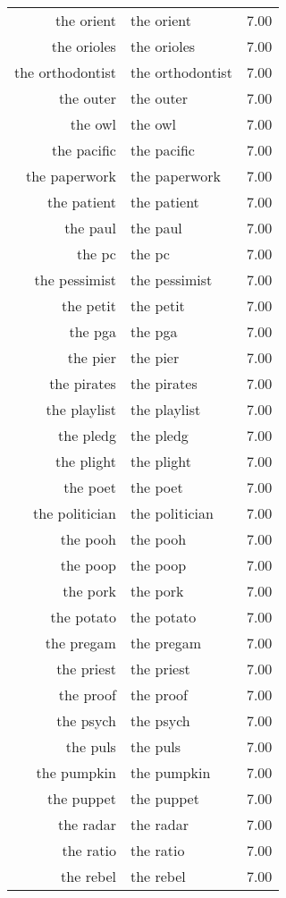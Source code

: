 \begin{table}[ht]
\begin{tabular}{rlr}
  the orient & the orient & 7.00 \\ 
  the orioles & the orioles & 7.00 \\ 
  the orthodontist & the orthodontist & 7.00 \\ 
  the outer & the outer & 7.00 \\ 
  the owl & the owl & 7.00 \\ 
  the pacific & the pacific & 7.00 \\ 
  the paperwork & the paperwork & 7.00 \\ 
  the patient & the patient & 7.00 \\ 
  the paul & the paul & 7.00 \\ 
  the pc & the pc & 7.00 \\ 
  the pessimist & the pessimist & 7.00 \\ 
  the petit & the petit & 7.00 \\ 
  the pga & the pga & 7.00 \\ 
  the pier & the pier & 7.00 \\ 
  the pirates & the pirates & 7.00 \\ 
  the playlist & the playlist & 7.00 \\ 
  the pledg & the pledg & 7.00 \\ 
  the plight & the plight & 7.00 \\ 
  the poet & the poet & 7.00 \\ 
  the politician & the politician & 7.00 \\ 
  the pooh & the pooh & 7.00 \\ 
  the poop & the poop & 7.00 \\ 
  the pork & the pork & 7.00 \\ 
  the potato & the potato & 7.00 \\ 
  the pregam & the pregam & 7.00 \\ 
  the priest & the priest & 7.00 \\ 
  the proof & the proof & 7.00 \\ 
  the psych & the psych & 7.00 \\ 
  the puls & the puls & 7.00 \\ 
  the pumpkin & the pumpkin & 7.00 \\ 
  the puppet & the puppet & 7.00 \\ 
  the radar & the radar & 7.00 \\ 
  the ratio & the ratio & 7.00 \\ 
  the rebel & the rebel & 7.00 \\ 

\end{tabular}
\end{table}
